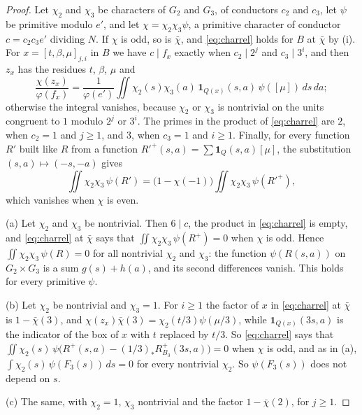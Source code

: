 \begin{proof}
Let $\chi_{2}$ and $\chi_{3}$ be characters of $G_{2}$ and $G_{3}$, of
conductors $c_{2}$ and $c_{3}$, let $\psi$ be primitive modulo $e'$, and let
$\chi=\chi_{2}\chi_{3}\psi$, a primitive character of conductor
$c=c_{2}c_{3}e'$ dividing $N$. If $\chi$ is odd, so is $\bar\chi$, and
\eqref{eq:charrel} holds for $B$ at $\bar\chi$ by (i).
For $x=[t,\beta,\mu]_{j,i}$ in $B$ we have $c\mid f_{x}$ exactly when
$c_{2}\mid2^{j}$ and $c_{3}\mid3^{i}$, and then $z_{x}$ has the residues $t$,
$\beta$, $\mu$ and
\[
  \frac{\chi(z_{x})}{\varphi(f_{x})}=\frac{1}{\varphi(e')}\iint
  \chi_{2}(s)\chi_{3}(a)\,\mathbf 1_{Q(x)}(s,a)\,\psi([\mu])\,ds\,da;
\]
otherwise the integral vanishes, because $\chi_{2}$ or $\chi_{3}$ is
nontrivial on the units congruent to $1$ modulo $2^{j}$ or $3^{i}$. The
primes in the product of \eqref{eq:charrel} are $2$, when $c_{2}=1$ and
$j\ge1$, and $3$, when $c_{3}=1$ and $i\ge1$. Finally, for every function
$R'$ built like $R$ from a function $R'^{+}(s,a)=\sum\mathbf 1_{Q}(s,a)[\mu]$,
the substitution $(s,a)\mapsto(-s,-a)$ gives
\[
  \iint\chi_{2}\chi_{3}\,\psi(R')=\bigl(1-\chi(-1)\bigr)
  \iint\chi_{2}\chi_{3}\,\psi(R'^{+}),
\]
which vanishes when $\chi$ is even.

(a) Let $\chi_{2}$ and $\chi_{3}$ be nontrivial. Then $6\mid c$, the product
in \eqref{eq:charrel} is empty, and \eqref{eq:charrel} at $\bar\chi$ says
that $\iint\chi_{2}\chi_{3}\,\psi(R^{+})=0$ when $\chi$ is odd. Hence
$\iint\chi_{2}\chi_{3}\,\psi(R)=0$ for all nontrivial $\chi_{2}$ and
$\chi_{3}$: the function $\psi(R(s,a))$ on $G_{2}\times G_{3}$ is a sum
$g(s)+h(a)$, and its second differences vanish. This holds for every
primitive $\psi$.

(b) Let $\chi_{2}$ be nontrivial and $\chi_{3}=1$. For $i\ge1$ the factor of
$x$ in \eqref{eq:charrel} at $\bar\chi$ is $1-\bar\chi(3)$, and
$\chi(z_{x})\bar\chi(3)=\chi_{2}(t/3)\psi(\mu/3)$, while $\mathbf
1_{Q(x)}(3s,a)$ is the indicator of the box of $x$ with $t$ replaced by
$t/3$. So \eqref{eq:charrel} says that
$\iint\chi_{2}(s)\,\psi\bigl(R^{+}(s,a)-(1/3)_{*}R_{B_{3}}^{+}(3s,a)\bigr)
=0$ when $\chi$ is odd, and as in (a), $\int\chi_{2}(s)\,\psi(F_{3}(s))\,ds=0$
for every nontrivial $\chi_{2}$. So $\psi(F_{3}(s))$ does not depend on $s$.

(c) The same, with $\chi_{2}=1$, $\chi_{3}$ nontrivial and the factor
$1-\bar\chi(2)$, for $j\ge1$.
\end{proof}

